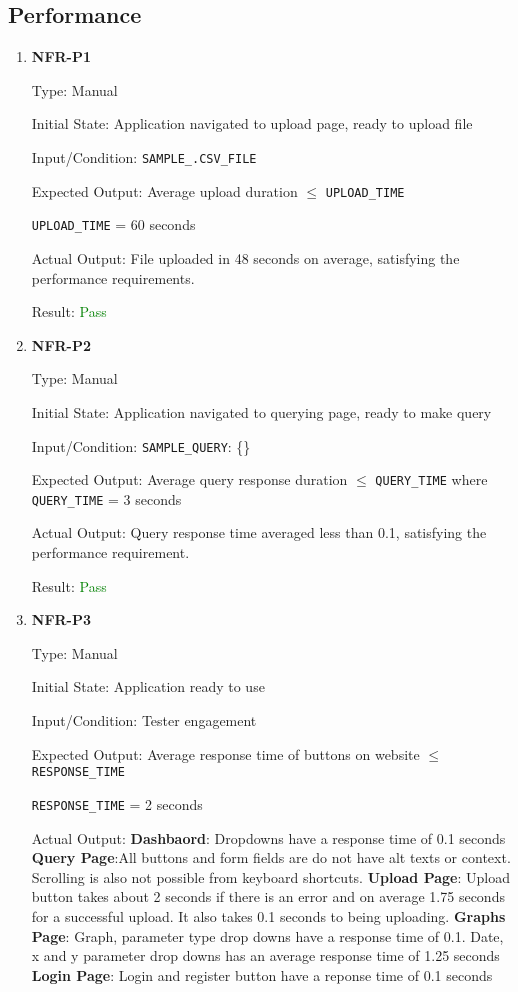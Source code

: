 \documentclass[12pt, titlepage]{article}
\begin{document}
\subsection{Performance}
\begin{enumerate}
  \item{\textbf{NFR-P1}} \label{NFR:P1}

Type: Manual

Initial State: Application navigated to upload page, ready to upload file

Input/Condition: \texttt{SAMPLE\_.CSV\_FILE}

Expected Output: Average upload duration $\leq$ \texttt{UPLOAD\_TIME}

\texttt{UPLOAD\_TIME} = 60 seconds

Actual Output: File uploaded in 48 seconds on average, satisfying the
performance requirements.

Result: \textcolor{green}{Pass}

  \item{\textbf{NFR-P2}} \label{NFR:P2}

Type: Manual

Initial State: Application navigated to querying page, ready to make query

Input/Condition: \texttt{SAMPLE\_QUERY}: \{\}

Expected Output: Average query response duration $\leq$ \texttt{QUERY\_TIME}
where \texttt{QUERY\_TIME} = 3 seconds

Actual Output: Query response time averaged less than 0.1, satisfying the
performance requirement.

Result: \textcolor{green}{Pass}

\item{\textbf{NFR-P3}} \label{NFR:P3}

Type: Manual

Initial State: Application ready to use

Input/Condition: Tester engagement

Expected Output: Average response time of buttons on website $\leq$
\texttt{RESPONSE\_TIME}

\texttt{RESPONSE\_TIME} = 2 seconds

Actual Output: \newline
\textbf{Dashbaord}: Dropdowns have a response time of 0.1 seconds \newline
\textbf{Query Page}:All buttons and form fields are do not have alt texts or
context. Scrolling is also not possible from keyboard shortcuts. \newline
\textbf{Upload Page}: Upload button takes about 2 seconds if there is an error
and on average 1.75 seconds for a successful upload. It also takes 0.1 seconds
to being uploading. \newline
\textbf{Graphs Page}: Graph, parameter type drop downs have a response time of
0.1. Date, x and y parameter drop downs has an average response time of 1.25
seconds \newline
\textbf{Login Page}: Login and register button have a reponse time of 0.1 seconds


\end{enumerate}
\end{document}
